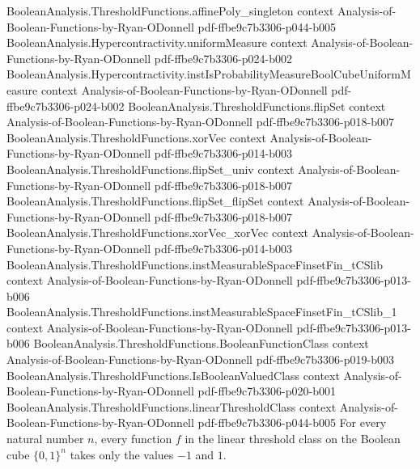 \begin{lemma}
\proofstep
  {BooleanAnalysis.ThresholdFunctions.affinePoly_singleton}
  {context}
  {Analysis-of-Boolean-Functions-by-Ryan-ODonnell}
  {pdf-ffbe9c7b3306-p044-b005}
\proofstep
  {BooleanAnalysis.Hypercontractivity.uniformMeasure}
  {context}
  {Analysis-of-Boolean-Functions-by-Ryan-ODonnell}
  {pdf-ffbe9c7b3306-p024-b002}
\proofstep
  {BooleanAnalysis.Hypercontractivity.instIsProbabilityMeasureBoolCubeUniformMeasure}
  {context}
  {Analysis-of-Boolean-Functions-by-Ryan-ODonnell}
  {pdf-ffbe9c7b3306-p024-b002}
\proofstep
  {BooleanAnalysis.ThresholdFunctions.flipSet}
  {context}
  {Analysis-of-Boolean-Functions-by-Ryan-ODonnell}
  {pdf-ffbe9c7b3306-p018-b007}
\proofstep
  {BooleanAnalysis.ThresholdFunctions.xorVec}
  {context}
  {Analysis-of-Boolean-Functions-by-Ryan-ODonnell}
  {pdf-ffbe9c7b3306-p014-b003}
\proofstep
  {BooleanAnalysis.ThresholdFunctions.flipSet_univ}
  {context}
  {Analysis-of-Boolean-Functions-by-Ryan-ODonnell}
  {pdf-ffbe9c7b3306-p018-b007}
\proofstep
  {BooleanAnalysis.ThresholdFunctions.flipSet_flipSet}
  {context}
  {Analysis-of-Boolean-Functions-by-Ryan-ODonnell}
  {pdf-ffbe9c7b3306-p018-b007}
\proofstep
  {BooleanAnalysis.ThresholdFunctions.xorVec_xorVec}
  {context}
  {Analysis-of-Boolean-Functions-by-Ryan-ODonnell}
  {pdf-ffbe9c7b3306-p014-b003}
\proofstep
  {BooleanAnalysis.ThresholdFunctions.instMeasurableSpaceFinsetFin_tCSlib}
  {context}
  {Analysis-of-Boolean-Functions-by-Ryan-ODonnell}
  {pdf-ffbe9c7b3306-p013-b006}
\proofstep
  {BooleanAnalysis.ThresholdFunctions.instMeasurableSpaceFinsetFin_tCSlib_1}
  {context}
  {Analysis-of-Boolean-Functions-by-Ryan-ODonnell}
  {pdf-ffbe9c7b3306-p013-b006}
\proofstep
  {BooleanAnalysis.ThresholdFunctions.BooleanFunctionClass}
  {context}
  {Analysis-of-Boolean-Functions-by-Ryan-ODonnell}
  {pdf-ffbe9c7b3306-p019-b003}
\proofstep
  {BooleanAnalysis.ThresholdFunctions.IsBooleanValuedClass}
  {context}
  {Analysis-of-Boolean-Functions-by-Ryan-ODonnell}
  {pdf-ffbe9c7b3306-p020-b001}
\proofstep
  {BooleanAnalysis.ThresholdFunctions.linearThresholdClass}
  {context}
  {Analysis-of-Boolean-Functions-by-Ryan-ODonnell}
  {pdf-ffbe9c7b3306-p044-b005}
For every natural number $n$, every function $f$ in the linear threshold class on the
Boolean cube $\{0,1\}^n$ takes only the values $-1$ and $1$.
\end{lemma}

